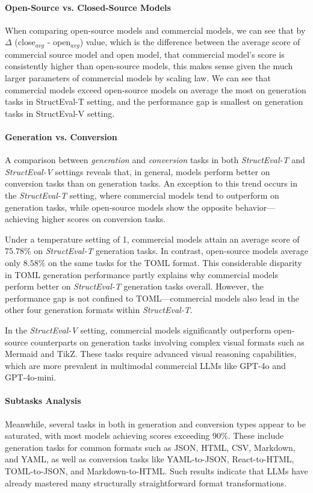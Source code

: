\paragraph{Open-Source vs. Closed-Source Models}
When comparing open-source models and commercial models, we can see that by $\Delta$ (close$_{avg}$ - open$_{avg}$) value, which is the difference between the average score of commercial source model and open model, that commercial model's score is consistently higher than open-source models, this makes sense given the much larger parameters of commercial models by scaling law. We can see that commercial models exceed open-source models on average the most on generation tasks in StructEval-T setting, and the performance gap is smallest on generation tasks in StructEval-V setting. 

\paragraph{Generation vs. Conversion}
A comparison between \emph{generation} and \emph{conversion} tasks in both \emph{StructEval-T} and \emph{StructEval-V} settings reveals that, in general, models perform better on conversion tasks than on generation tasks. An exception to this trend occurs in the \emph{StructEval-T} setting, where commercial models tend to outperform on generation tasks, while open-source models show the opposite behavior—achieving higher scores on conversion tasks.

Under a temperature setting of 1, commercial models attain an average score of $75.78\%$ on \emph{StructEval-T} generation tasks. In contrast, open-source models average only $8.58\%$ on the same tasks for the TOML format. This considerable disparity in TOML generation performance partly explains why commercial models perform better on \emph{StructEval-T} generation tasks overall. However, the performance gap is not confined to TOML—commercial models also lead in the other four generation formats within \emph{StructEval-T}.

In the \emph{StructEval-V} setting, commercial models significantly outperform open-source counterparts on generation tasks involving complex visual formats such as Mermaid and TikZ. These tasks require advanced visual reasoning capabilities, which are more prevalent in multimodal commercial LLMs like GPT-4o and GPT-4o-mini.


\paragraph{Subtasks Analysis}
Meanwhile, several tasks in both in generation and conversion types appear to be saturated, with most models achieving scores exceeding $90\%$. These include generation tasks for common formats such as JSON, HTML, CSV, Markdown, and YAML, as well as conversion tasks like YAML-to-JSON, React-to-HTML, TOML-to-JSON, and Markdown-to-HTML. Such results indicate that LLMs have already mastered many structurally straightforward format transformations.

